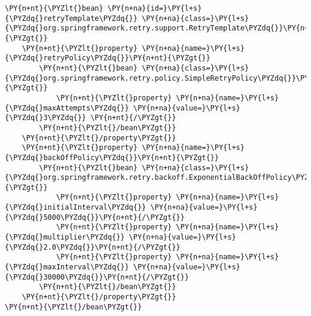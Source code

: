 \begin{Verbatim}[commandchars=\\\{\}]
\PY{n+nt}{\PYZlt{}bean} \PY{n+na}{id=}\PY{l+s}{\PYZdq{}retryTemplate\PYZdq{}} \PY{n+na}{class=}\PY{l+s}{\PYZdq{}org.springframework.retry.support.RetryTemplate\PYZdq{}}\PY{n+nt}{\PYZgt{}}
    \PY{n+nt}{\PYZlt{}property} \PY{n+na}{name=}\PY{l+s}{\PYZdq{}retryPolicy\PYZdq{}}\PY{n+nt}{\PYZgt{}}
        \PY{n+nt}{\PYZlt{}bean} \PY{n+na}{class=}\PY{l+s}{\PYZdq{}org.springframework.retry.policy.SimpleRetryPolicy\PYZdq{}}\PY{n+nt}{\PYZgt{}}
            \PY{n+nt}{\PYZlt{}property} \PY{n+na}{name=}\PY{l+s}{\PYZdq{}maxAttempts\PYZdq{}} \PY{n+na}{value=}\PY{l+s}{\PYZdq{}3\PYZdq{}} \PY{n+nt}{/\PYZgt{}}
        \PY{n+nt}{\PYZlt{}/bean\PYZgt{}}
    \PY{n+nt}{\PYZlt{}/property\PYZgt{}}
    \PY{n+nt}{\PYZlt{}property} \PY{n+na}{name=}\PY{l+s}{\PYZdq{}backOffPolicy\PYZdq{}}\PY{n+nt}{\PYZgt{}}
        \PY{n+nt}{\PYZlt{}bean} \PY{n+na}{class=}\PY{l+s}{\PYZdq{}org.springframework.retry.backoff.ExponentialBackOffPolicy\PYZdq{}}\PY{n+nt}{\PYZgt{}}
            \PY{n+nt}{\PYZlt{}property} \PY{n+na}{name=}\PY{l+s}{\PYZdq{}initialInterval\PYZdq{}} \PY{n+na}{value=}\PY{l+s}{\PYZdq{}5000\PYZdq{}}\PY{n+nt}{/\PYZgt{}}
            \PY{n+nt}{\PYZlt{}property} \PY{n+na}{name=}\PY{l+s}{\PYZdq{}multiplier\PYZdq{}} \PY{n+na}{value=}\PY{l+s}{\PYZdq{}2.0\PYZdq{}}\PY{n+nt}{/\PYZgt{}}
            \PY{n+nt}{\PYZlt{}property} \PY{n+na}{name=}\PY{l+s}{\PYZdq{}maxInterval\PYZdq{}} \PY{n+na}{value=}\PY{l+s}{\PYZdq{}30000\PYZdq{}}\PY{n+nt}{/\PYZgt{}}
        \PY{n+nt}{\PYZlt{}/bean\PYZgt{}}
    \PY{n+nt}{\PYZlt{}/property\PYZgt{}}
\PY{n+nt}{\PYZlt{}/bean\PYZgt{}}
\end{Verbatim}
